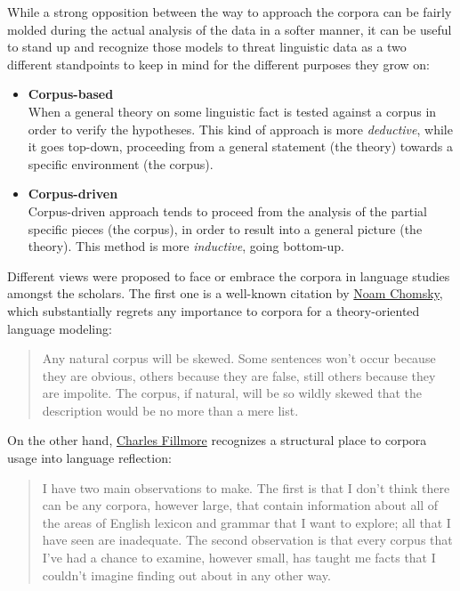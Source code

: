 \documentclass[
  a4paper,
  twoside,
  12pt,
  chapterprefix=false,
  bibliography=totocnumbered,
  listof=flat]{scrbook}
\begin{document}
While a strong opposition between the way to approach the corpora can be fairly molded during the actual analysis of the data in a softer manner, it can be useful to stand up and recognize those models to threat linguistic data as a two different standpoints to keep in mind for the different purposes they grow on:

\begin{itemize}
\item
  \textbf{Corpus-based}\\
  When a general theory on some linguistic fact is tested against a corpus in order to verify the hypotheses.
  This kind of approach is more \emph{deductive}, while it goes top-down, proceeding from a general statement (the theory) towards a specific environment (the corpus).
\item
  \textbf{Corpus-driven}\\
  Corpus-driven approach tends to proceed from the analysis of the partial specific pieces (the corpus), in order to result into a general picture (the theory).
  This method is more \emph{inductive}, going bottom-up.
\end{itemize}

Different views were proposed to face or embrace the corpora in language studies amongst the scholars. The first one is a well-known citation by \href{https://en.wikipedia.org/wiki/Noam_Chomsky}{Noam Chomsky}, which substantially regrets any importance to corpora for a theory-oriented language modeling:

\begin{quote}
Any natural corpus will be skewed.
Some sentences won't occur because they are obvious, others because they are false, still others because they are impolite.
The corpus, if natural, will be so wildly skewed that the description would be no more than a mere list.
\citep[Chomsky 1962, \emph{A transformational approach to syntax} in][]{togninibonelli2001}
\end{quote}

On the other hand, \href{https://en.wikipedia.org/wiki/Charles_J._Fillmore}{Charles Fillmore} recognizes a structural place to corpora usage into language reflection:

\begin{quote}
I have two main observations to make. The first is that I don't think there can be any corpora, however large, that contain information about all of the areas of English lexicon and grammar that I want to explore; all that I have seen are inadequate. The second observation is that every corpus that I've had a chance to examine, however small, has taught me facts that I couldn't imagine finding out about in any other way.
\citep{fillmore1992}
\end{quote}
\end{document}
